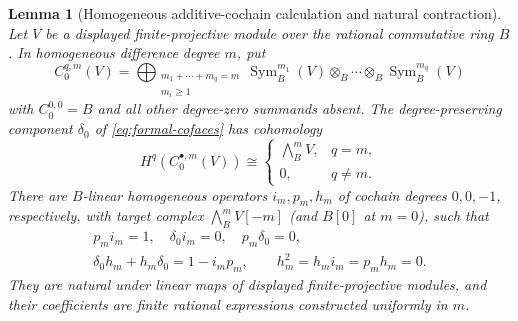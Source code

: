 \documentclass[11pt,a4paper]{article}
\numberwithin{algorithm}{section}
\numberwithin{equation}{section}
\newtheorem{lemma}[lemma]{Lemma}
\theoremstyle{definition}
\theoremstyle{remark}
\theoremstyle{plain}
\newcommand{\Sym}{\operatorname{Sym}}
\theoremstyle{definition}
\theoremstyle{plain}
\begin{document}
\begin{lemma}[Homogeneous additive-cochain calculation and natural contraction]
\label{lem:additive-bar-koszul}
Let $V$ be a displayed finite-projective module over the rational
commutative ring $B$.  In homogeneous difference degree $m$, put
\[
 C^{q,m}_0(V)=
 \bigoplus_{\substack{m_1+\cdots+m_q=m\\m_i\ge1}}
 \Sym_B^{m_1}(V)\otimes_B\cdots\otimes_B\Sym_B^{m_q}(V)
\]
with $C^{0,0}_0=B$ and all other degree-zero summands absent.
The degree-preserving component $\delta_0$ of
\eqref{eq:formal-cofaces} has cohomology
\[
 H^q(C^{\bullet,m}_0(V))\cong
 \begin{cases}\bigwedge_B^mV,&q=m,\\0,&q\ne m.\end{cases}
\]
There are $B$-linear homogeneous operators
$i_m,p_m,h_m$ of cochain degrees $0,0,-1$, respectively,
with target complex $\bigwedge_B^mV[-m]$ (and $B[0]$ at $m=0$),
such that
\begin{equation}\label{eq:homogeneous-contraction}
 \begin{gathered}
 p_mi_m=1,\quad \delta_0i_m=0,\quad p_m\delta_0=0,\\
 \delta_0h_m+h_m\delta_0=1-i_mp_m,\qquad
 h_m^2=h_mi_m=p_mh_m=0.
 \end{gathered}
\end{equation}
They are natural under linear maps of displayed finite-projective
modules, and their coefficients are finite rational expressions
constructed uniformly in $m$.
\end{lemma}
\end{document}
